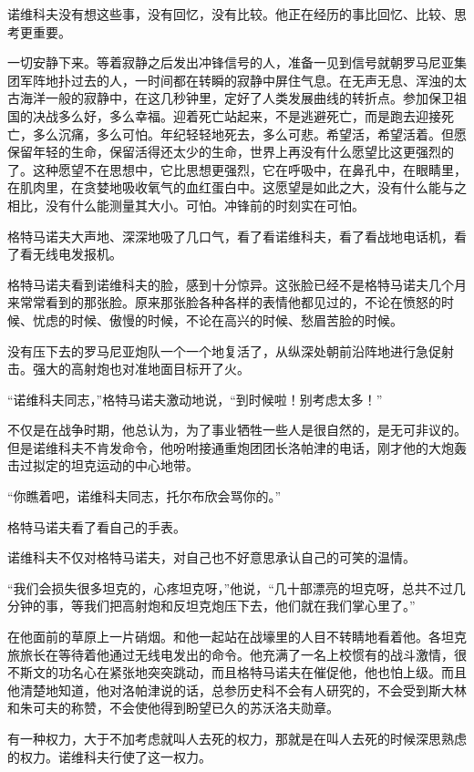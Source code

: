 诺维科夫没有想这些事，没有回忆，没有比较。他正在经历的事比回忆、比较、思考更重要。

一切安静下来。等着寂静之后发出冲锋信号的人，准备一见到信号就朝罗马尼亚集团军阵地扑过去的人，一时间都在转瞬的寂静中屏住气息。在无声无息、浑浊的太古海洋一般的寂静中，在这几秒钟里，定好了人类发展曲线的转折点。参加保卫祖国的决战多么好，多么幸福。迎着死亡站起来，不是逃避死亡，而是跑去迎接死亡，多么沉痛，多么可怕。年纪轻轻地死去，多么可悲。希望活，希望活着。但愿保留年轻的生命，保留活得还太少的生命，世界上再没有什么愿望比这更强烈的了。这种愿望不在思想中，它比思想更强烈，它在呼吸中，在鼻孔中，在眼睛里，在肌肉里，在贪婪地吸收氧气的血红蛋白中。这愿望是如此之大，没有什么能与之相比，没有什么能测量其大小。可怕。冲锋前的时刻实在可怕。

格特马诺夫大声地、深深地吸了几口气，看了看诺维科夫，看了看战地电话机，看了看无线电发报机。

格特马诺夫看到诺维科夫的脸，感到十分惊异。这张脸已经不是格特马诺夫几个月来常常看到的那张脸。原来那张脸各种各样的表情他都见过的，不论在愤怒的时候、忧虑的时候、傲慢的时候，不论在高兴的时候、愁眉苦脸的时候。

没有压下去的罗马尼亚炮队一个一个地复活了，从纵深处朝前沿阵地进行急促射击。强大的高射炮也对准地面目标开了火。

“诺维科夫同志，”格特马诺夫激动地说，“到时候啦！别考虑太多！”

不仅是在战争时期，他总认为，为了事业牺牲一些人是很自然的，是无可非议的。但是诺维科夫不肯发命令，他吩咐接通重炮团团长洛帕津的电话，刚才他的大炮轰击过拟定的坦克运动的中心地带。

“你瞧着吧，诺维科夫同志，托尔布欣会骂你的。”

格特马诺夫看了看自己的手表。

诺维科夫不仅对格特马诺夫，对自己也不好意思承认自己的可笑的温情。

“我们会损失很多坦克的，心疼坦克呀，”他说，“几十部漂亮的坦克呀，总共不过几分钟的事，等我们把高射炮和反坦克炮压下去，他们就在我们掌心里了。”

在他面前的草原上一片硝烟。和他一起站在战壕里的人目不转睛地看着他。各坦克旅旅长在等待着他通过无线电发出的命令。他充满了一名上校惯有的战斗激情，很不斯文的功名心在紧张地突突跳动，而且格特马诺夫在催促他，他也怕上级。而且他清楚地知道，他对洛帕津说的话，总参历史科不会有人研究的，不会受到斯大林和朱可夫的称赞，不会使他得到盼望已久的苏沃洛夫勋章。

有一种权力，大于不加考虑就叫人去死的权力，那就是在叫人去死的时候深思熟虑的权力。诺维科夫行使了这一权力。

